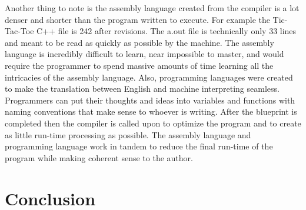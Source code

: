 \documentclass{article}
\theoremstyle{theorem}
\theoremstyle{definition}
\theoremstyle{remark}
\begin{document}
Another thing to note is the assembly language created from the compiler is a lot denser and shorter than the program written to execute. For example the Tic-Tac-Toe C++ file is 242 after revisions. The a.out file is technically only 33 lines and meant to be read as quickly as possible by the machine. The assembly language is incredibly difficult to learn, near impossible to master, and would require the programmer to spend massive amounts of time learning all the intricacies of the assembly language. Also, programming languages were created to make the translation between English and machine interpreting seamless. Programmers can put their thoughts and ideas into variables and functions with naming conventions that make sense to whoever is writing. After the blueprint is completed then the compiler is called upon to optimize the program and to create as little run-time processing as possible. The assembly language and programming language work in tandem to reduce the final run-time of the program while making coherent sense to the author.

\section{Conclusion}\label{conclusion}
\end{document}
